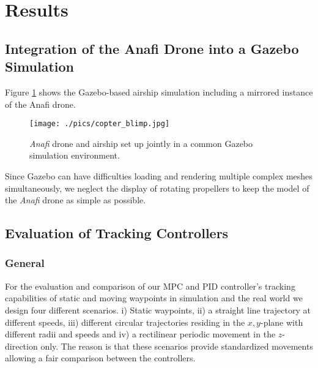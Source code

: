 \section{Results}\label{sec:experiments}
\subsection{Integration of the Anafi Drone into a Gazebo Simulation}
Figure \ref{fig:anafi_blimp} shows the Gazebo-based airship simulation \cite{price2022} including a mirrored instance of the Anafi drone. 
\begin{figure}[thpb]
      \centering
		\texttt{[image: ./pics/copter\_blimp.jpg]}
\caption{\textit{Anafi} drone and airship set up jointly in a common Gazebo simulation environment. }
\label{fig:anafi_blimp}
 \end{figure}
Since Gazebo can have difficulties loading and rendering multiple complex meshes simultaneously, we neglect the display of rotating propellers to keep the model of the \textit{Anafi} drone as simple as possible.
 
 
\subsection{Evaluation of Tracking Controllers}
\subsubsection*{General}
For the evaluation and comparison of our MPC and PID controller's tracking capabilities of static and moving waypoints in simulation and the real world we design four different scenarios. i) Static waypoints, ii) a straight line trajectory at different speeds, iii)  different circular trajectories residing in the $x,y$-plane with different radii and  speeds and iv) a rectilinear periodic movement in the $z$-direction only. The reason is that these scenarios provide standardized movements allowing a fair comparison between the controllers.
